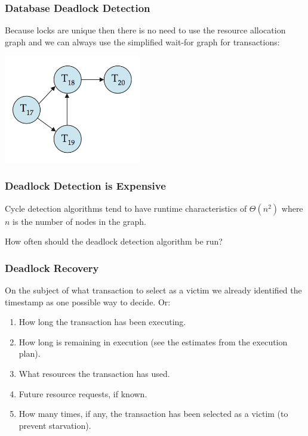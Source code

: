 \begin{frame}
\frametitle{Database Deadlock Detection}

Because locks are unique then there is no need to use the resource allocation graph and we can always use the simplified wait-for graph for transactions:

\begin{center}
\includegraphics[width=0.45\textwidth]{images/transaction-waitfor.png}
\end{center}


\end{frame}

\begin{frame}
\frametitle{Deadlock Detection is Expensive}

Cycle detection algorithms tend to have runtime characteristics of $\Theta(n^{2})$ where $n$ is the number of nodes in the graph.

How often should the deadlock detection algorithm be run?


\end{frame}

\begin{frame}
\frametitle{Deadlock Recovery}

On the subject of what transaction to select as a victim we already identified the timestamp as one possible way to decide. Or: 

\begin{enumerate}
\item How long the transaction has been executing.
	\item How long is remaining in execution (see the estimates from the execution plan).
	\item What resources the transaction has used.
	\item Future resource requests, if known.
	\item How many times, if any, the transaction has been selected as a victim (to prevent starvation).
\end{enumerate}

\end{frame}


